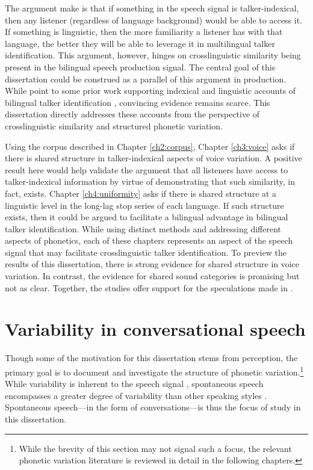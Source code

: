 The argument \citet{orena_2019_identifying} make is that if something in the speech signal is talker-indexical, then any listener (regardless of language background) would be able to access it. If something is linguistic, then the more familiarity a listener has with that language, the better they will be able to leverage it in multilingual talker identification. This argument, however, hinges on crosslinguistic similarity being present in the bilingual speech production signal. The central goal of this dissertation could be construed as a parallel of this argument in production. While \citet{orena_2019_identifying} point to some prior work supporting indexical and linguistic accounts of bilingual talker identification \citep[e.g.,]{theodore_2019_voice, sundara_2006_production}, convincing evidence remains scarce. This dissertation directly addresses these accounts from the perspective of crosslinguistic similarity and structured phonetic variation. 

Using the corpus described in Chapter \ref{ch2:corpus}, Chapter \ref{ch3:voice} asks if there is shared structure in talker-indexical aspects of voice variation. A positive result here would help validate the argument that all listeners have access to talker-indexical information by virtue of demonstrating that such similarity, in fact, exists. Chapter \ref{ch4:uniformity} asks if there is shared structure at a linguistic level in the long-lag stop series of each language. If such structure exists, then it could be argued to facilitate a bilingual advantage in bilingual talker identification. While using distinct methods and addressing different aspects of phonetics, each of these chapters represents an aspect of the speech signal that may facilitate crosslinguistic talker identification. To preview the results of this dissertation, there is strong evidence for shared structure in voice variation. In contrast, the evidence for shared sound categories is promising but not as clear. Together, the studies offer support for the speculations made in \citet{orena_2019_identifying}.

\section{Variability in conversational speech}\label{ch1:sec:spontaneous}

Though some of the motivation for this dissertation stems from perception, the primary goal is to document and investigate the structure of phonetic variation.\footnote{While the brevity of this section may not signal such a focus, the relevant phonetic variation literature is reviewed in detail in the following chapters.} While variability is inherent to the speech signal \citep[cf. the lack of invariance problem;][]{liberman_1967_perception}, spontaneous speech encompasses a greater degree of variability than other speaking styles \citep[e.g., reduction phenomena;][]{johnson_2004_massive}. Spontaneous speech---in the form of conversations---is thus the focus of study in this dissertation. 


